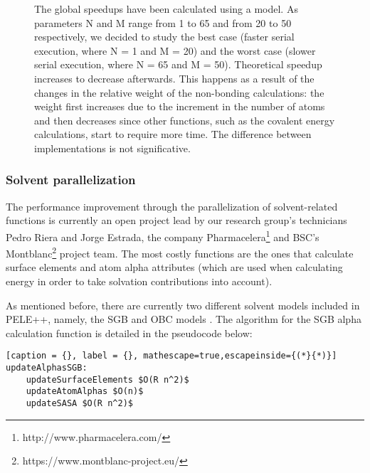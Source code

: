 \begin{figure}


\caption{The global speedups have been calculated using a model. As parameters N and M range from 1
to 65 and from 20 to 50 respectively, we decided to study the best case (faster serial execution, where N = 1 and M
= 20) and the worst case (slower serial execution, where N = 65 and M = 50). Theoretical speedup increases to 
decrease afterwards. This happens as a result of the changes in the relative weight of the non-bonding calculations: the weight first
increases due to the increment in the number of atoms and then decreases since other functions, such as the covalent energy
calculations, start to require more time. The difference between implementations is not significative.}

\label{fig:cuda_global_speedup}

\end{figure}


\bigskip

\subsubsection{Solvent parallelization}

The performance improvement through the parallelization of solvent-related functions is currently an open project
lead by our research group's technicians Pedro Riera and Jorge Estrada, the company
Pharmacelera\footnote{http://www.pharmacelera.com/} and BSC's Montblanc\footnote{https://www.montblanc-project.eu/}
project team. The most costly functions are the ones that calculate surface elements and atom alpha attributes (which
are used when calculating energy in order to take solvation contributions into account).

As mentioned before, there are currently two different solvent models included in PELE++, namely, the SGB
\cite{ghosh_generalized_1998} and OBC models \cite{onufriev_exploring_2004}. The
algorithm for the SGB alpha calculation function is detailed in the pseudocode below:


\begin{lstlisting}[caption = {}, label = {}, mathescape=true,escapeinside={(*}{*)}]
updateAlphasSGB:
	updateSurfaceElements $O(R n^2)$
	updateAtomAlphas $O(n)$
	updateSASA $O(R n^2)$

\end{lstlisting}

